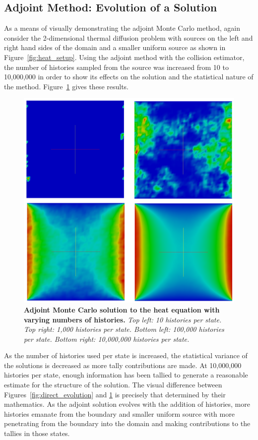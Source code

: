 \subsection{Adjoint Method: Evolution of a Solution}
\label{subsec:adjoint_evolution}
As a means of visually demonstrating the adjoint Monte Carlo method,
again consider the 2-dimensional thermal diffusion problem with
sources on the left and right hand sides of the domain and a smaller
uniform source as shown in Figure~\ref{fig:heat_setup}. Using the
adjoint method with the collision estimator, the number of histories
sampled from the source was increased from 10 to 10,000,000 in order
to show its effects on the solution and the statistical nature of the
method. Figure~\ref{fig:adjoint_evolution} gives these results.
\begin{figure}[t!]
  \begin{center}
    \includegraphics[width=5in]{chapters/mc_background/adjoint_evolution.png}
  \end{center}
  \caption{\textbf{Adjoint Monte Carlo solution to the heat equation
      with varying numbers of histories.} \textit{Top left: 10
      histories per state. Top right: 1,000 histories per
      state. Bottom left: 100,000 histories per state. Bottom right:
      10,000,000 histories per state.}}
  \label{fig:adjoint_evolution}
\end{figure}
As the number of histories used per state is increased, the
statistical variance of the solutions is decreased as more tally
contributions are made. At 10,000,000 histories per state, enough
information has been tallied to generate a reasonable estimate for the
structure of the solution. The visual difference between
Figures~\ref{fig:direct_evolution} and \ref{fig:adjoint_evolution} is
precisely that determined by their mathematics. As the adjoint
solution evolves with the addition of histories, more histories
emanate from the boundary and smaller uniform source with more
penetrating from the boundary into the domain and making contributions
to the tallies in those states.
\clearpage

